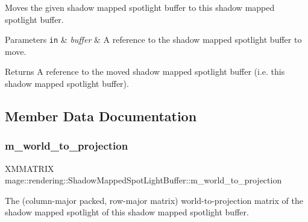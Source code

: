 Moves the given shadow mapped spotlight buffer to this shadow mapped spotlight buffer.


\begin{DoxyParams}[1]{Parameters}
\mbox{\tt in}  & {\em buffer} & A reference to the shadow mapped spotlight buffer to move. \\
\hline
\end{DoxyParams}
\begin{DoxyReturn}{Returns}
A reference to the moved shadow mapped spotlight buffer (i.\+e. this shadow mapped spotlight buffer). 
\end{DoxyReturn}


\subsection{Member Data Documentation}
\mbox{\label{structmage_1_1rendering_1_1_shadow_mapped_spot_light_buffer_abb736c590c4a6efff217e15ef8abec4a}} 
\subsubsection{\texorpdfstring{m\+\_\+world\+\_\+to\+\_\+projection}{m\_world\_to\_projection}}
{\footnotesize\ttfamily X\+M\+M\+A\+T\+R\+IX mage\+::rendering\+::\+Shadow\+Mapped\+Spot\+Light\+Buffer\+::m\+\_\+world\+\_\+to\+\_\+projection}

The (column-\/major packed, row-\/major matrix) world-\/to-\/projection matrix of the shadow mapped spotlight of this shadow mapped spotlight buffer. 